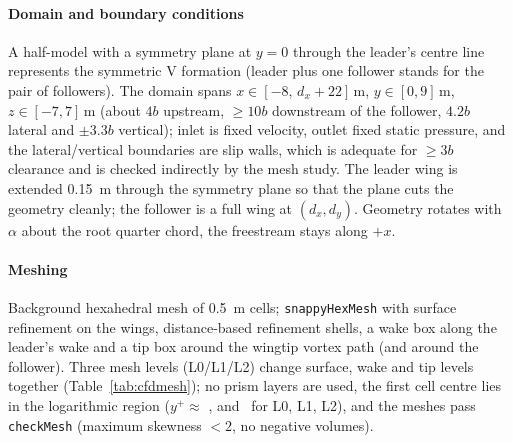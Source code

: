 \paragraph{Domain and boundary conditions} A half-model with a symmetry plane at $y=0$ through the leader's centre line represents the symmetric V formation (leader plus one follower stands for the pair of followers). The domain spans $x\in[-8,\,d_x+22]$\,m, $y\in[0,9]$\,m, $z\in[-7,7]$\,m (about $4b$ upstream, $\ge10b$ downstream of the follower, $4.2b$ lateral and $\pm3.3b$ vertical); inlet is fixed velocity, outlet fixed static pressure, and the lateral/vertical boundaries are slip walls, which is adequate for $\ge3b$ clearance and is checked indirectly by the mesh study. The leader wing is extended \SI{0.15}{m} through the symmetry plane so that the plane cuts the geometry cleanly; the follower is a full wing at $(d_x,d_y)$. Geometry rotates with $\alpha$ about the root quarter chord, the freestream stays along $+x$.

\paragraph{Meshing} Background hexahedral mesh of \SI{0.5}{m} cells; \texttt{snappyHexMesh} with surface refinement on the wings, distance-based refinement shells, a wake box along the leader's wake and a tip box around the wingtip vortex path (and around the follower). Three mesh levels (L0/L1/L2) change surface, wake and tip levels together (Table~\ref{tab:cfdmesh}); no prism layers are used, the first cell centre lies in the logarithmic region ($y^+\approx$ \nyplusZero, \nyplusOne and \nyplusTwo\ for L0, L1, L2), and the meshes pass \texttt{checkMesh} (maximum skewness $<2$, no negative volumes).

